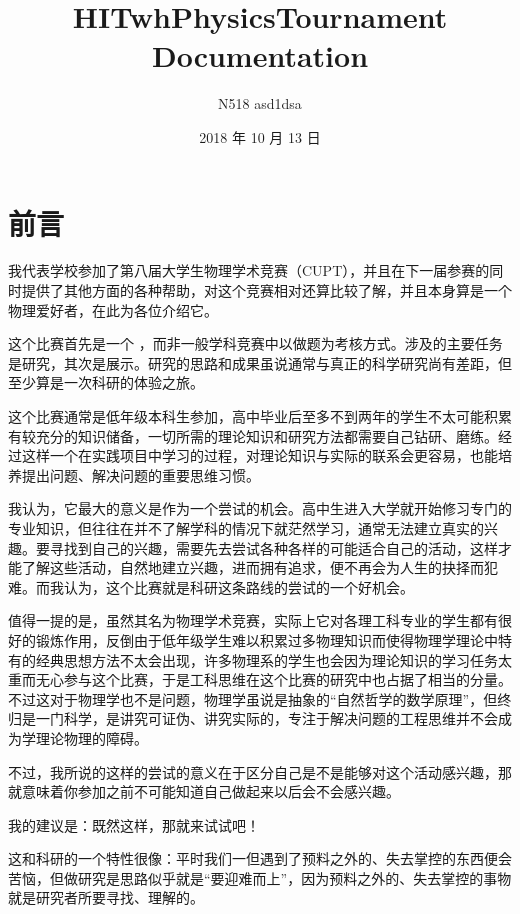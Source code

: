 \documentclass[a4paper,10pt,english]{sphinxmanual}
\title{HITwhPhysicsTournament Documentation}
\date{2018 年 10 月 13 日}
\author{N518 asd1dsa}
\begin{document}
\maketitle
\sphinxtableofcontents
{}\label{\detokenize{index::doc}}



\chapter{前言}
\label{\detokenize{1. Preface::doc}}\label{\detokenize{1. Preface:id1}}
我代表学校参加了第八届大学生物理学术竞赛（CUPT），并且在下一届参赛的同时提供了其他方面的各种帮助，对这个竞赛相对还算比较了解，并且本身算是一个物理爱好者，在此为各位介绍它。

这个比赛首先是一个  ，而非一般学科竞赛中以做题为考核方式。涉及的主要任务是研究，其次是展示。研究的思路和成果虽说通常与真正的科学研究尚有差距，但至少算是一次科研的体验之旅。

这个比赛通常是低年级本科生参加，高中毕业后至多不到两年的学生不太可能积累有较充分的知识储备，一切所需的理论知识和研究方法都需要自己钻研、磨练。经过这样一个在实践项目中学习的过程，对理论知识与实际的联系会更容易，也能培养提出问题、解决问题的重要思维习惯。

我认为，它最大的意义是作为一个尝试的机会。高中生进入大学就开始修习专门的专业知识，但往往在并不了解学科的情况下就茫然学习，通常无法建立真实的兴趣。要寻找到自己的兴趣，需要先去尝试各种各样的可能适合自己的活动，这样才能了解这些活动，自然地建立兴趣，进而拥有追求，便不再会为人生的抉择而犯难。而我认为，这个比赛就是科研这条路线的尝试的一个好机会。

值得一提的是，虽然其名为物理学术竞赛，实际上它对各理工科专业的学生都有很好的锻炼作用，反倒由于低年级学生难以积累过多物理知识而使得物理学理论中特有的经典思想方法不太会出现，许多物理系的学生也会因为理论知识的学习任务太重而无心参与这个比赛，于是工科思维在这个比赛的研究中也占据了相当的分量。不过这对于物理学也不是问题，物理学虽说是抽象的“自然哲学的数学原理”，但终归是一门科学，是讲究可证伪、讲究实际的，专注于解决问题的工程思维并不会成为学理论物理的障碍。

不过，我所说的这样的尝试的意义在于区分自己是不是能够对这个活动感兴趣，那就意味着你参加之前不可能知道自己做起来以后会不会感兴趣。

我的建议是：既然这样，那就来试试吧！

这和科研的一个特性很像：平时我们一但遇到了预料之外的、失去掌控的东西便会苦恼，但做研究是思路似乎就是“要迎难而上”，因为预料之外的、失去掌控的事物就是研究者所要寻找、理解的。
\end{document}
